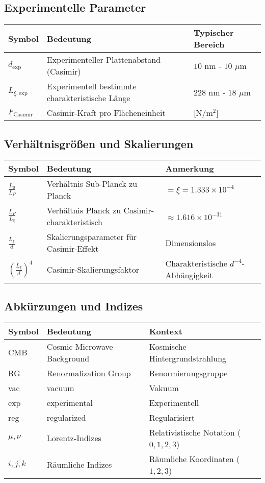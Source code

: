 \documentclass[12pt,a4paper]{article}
\begin{document}
	\subsection{Experimentelle Parameter}
	\begin{longtable}{p{2.5cm} p{10cm} p{3cm}}
		\toprule
		\textbf{Symbol} & \textbf{Bedeutung} & \textbf{Typischer Bereich} \\
		\midrule
		$d_{\text{exp}}$ & Experimenteller Plattenabstand (Casimir) & $10$ nm - $10$ $\mu$m \\
		$L_{\xi,\text{exp}}$ & Experimentell bestimmte charakteristische Länge & $228$ nm - $18$ $\mu$m \\
		$F_{\text{Casimir}}$ & Casimir-Kraft pro Flächeneinheit & [N/m$^2$] \\
		\bottomrule
	\end{longtable}
	
	\subsection{Verhältnisgrößen und Skalierungen}
	\begin{longtable}{p{2.5cm} p{10cm} p{3cm}}
		\toprule
		\textbf{Symbol} & \textbf{Bedeutung} & \textbf{Anmerkung} \\
		\midrule
		$\frac{L_0}{L_P}$ & Verhältnis Sub-Planck zu Planck & $= \xi = 1.333 \times 10^{-4}$ \\
		$\frac{L_P}{L_\xi}$ & Verhältnis Planck zu Casimir-charakteristisch & $\approx 1.616 \times 10^{-31}$ \\
		$\frac{L_\xi}{d}$ & Skalierungsparameter für Casimir-Effekt & Dimensionslos \\
		$\left(\frac{L_\xi}{d}\right)^4$ & Casimir-Skalierungsfaktor & Charakteristische $d^{-4}$-Abhängigkeit \\
		\bottomrule
	\end{longtable}
	
	\subsection{Abkürzungen und Indizes}
	\begin{longtable}{p{2.5cm} p{10cm} p{3cm}}
		\toprule
		\textbf{Symbol} & \textbf{Bedeutung} & \textbf{Kontext} \\
		\midrule
		CMB & Cosmic Microwave Background & Kosmische Hintergrundstrahlung \\
		RG & Renormalization Group & Renormierungsgruppe \\
		vac & vacuum & Vakuum \\
		exp & experimental & Experimentell \\
		reg & regularized & Regularisiert \\
		$\mu, \nu$ & Lorentz-Indizes & Relativistische Notation ($0,1,2,3$) \\
		$i, j, k$ & Räumliche Indizes & Räumliche Koordinaten ($1,2,3$) \\
		\bottomrule
	\end{longtable}
	
\end{document}
